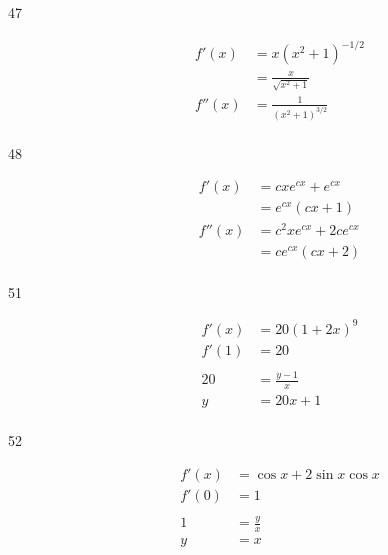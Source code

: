 \documentclass[letterpaper, landscape]{exam}
\begin{document}
\begin{description}
    \item[47] 
      \begin{align*}
        f'(x)  & = x \left( x^2 + 1 \right)^{-1/2} \\
               & = \boxed{ \frac{x}{\sqrt{x^2 + 1}} } \\
        f''(x) & = \boxed{ \frac{1}{\left( x^2 + 1 \right)^{3/2}} } \\
      \end{align*}

    \item[48] 
      \begin{align*}
        f'(x)  & = cx e^{cx} + e^{cx} \\
               & = \boxed{ e^{cx} (cx + 1) } \\
        f''(x) & = c^2 x e^{cx} + 2 c e^{cx} \\
               & = \boxed{ c e^{cx} ( cx + 2 ) } \\
      \end{align*}


    \item[51] 
      \begin{align*}
        f'(x) & = 20 (1 + 2x)^9 \\
        f'(1) & = 20 \\
        \\
        20    & = \frac{y - 1}{x} \\
        y     & = 20x + 1 \\
      \end{align*}

    \item[52] 
      \begin{align*}
        f'(x) & = \cos x + 2 \sin x \cos x \\
        f'(0) & = 1 \\
        \\
        1     & = \frac{y}{x} \\
        y     & = x \\
      \end{align*}


\end{description}
\end{document}
